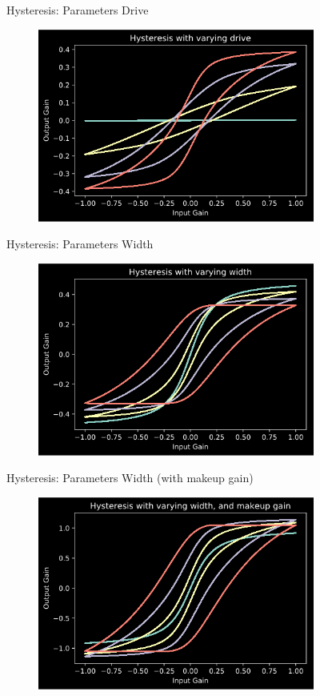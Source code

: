 \begin{frame}{Hysteresis: Parameters}
    Drive
    \begin{figure}
        \includegraphics[height=2.5in]{../Hysteresis/Pics/Drive}
    \end{figure}
\end{frame}

\begin{frame}{Hysteresis: Parameters}
    Width
    \begin{figure}
        \includegraphics[height=2.5in]{../Hysteresis/Pics/Width}
    \end{figure}
\end{frame}

\begin{frame}{Hysteresis: Parameters}
    Width (with makeup gain)
    \begin{figure}
        \includegraphics[height=2.5in]{../Hysteresis/Pics/Width_makeup}
    \end{figure}
\end{frame}

